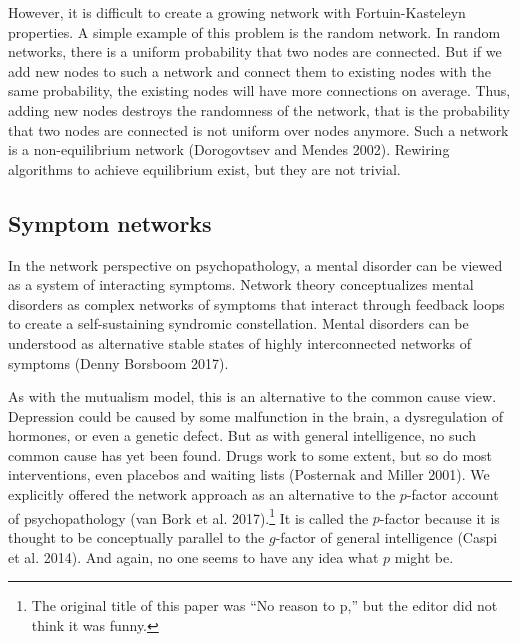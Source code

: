 \documentclass[
  a4paper,
  DIV=11,
  numbers=noendperiod,
  oneside]{scrreprt}
\begin{document}
However, it is difficult to create a growing network with
Fortuin-Kasteleyn properties. A simple example of this problem is the
random network. In random networks, there is a uniform probability that
two nodes are connected. But if we add new nodes to such a network and
connect them to existing nodes with the same probability, the existing
nodes will have more connections on average. Thus, adding new nodes
destroys the randomness of the network, that is the probability that two
nodes are connected is not uniform over nodes anymore. Such a network is
a non-equilibrium network (Dorogovtsev and Mendes 2002). Rewiring
algorithms to achieve equilibrium exist, but they are not trivial.

\hypertarget{sec-Symptom-networks}{%
\subsection{Symptom networks}\label{sec-Symptom-networks}}

In the network perspective on psychopathology, a mental disorder can be
viewed as a system of interacting symptoms. Network theory
conceptualizes mental disorders as complex networks of symptoms that
interact through feedback loops to create a self-sustaining syndromic
constellation. Mental disorders can be understood as alternative stable
states of highly interconnected networks of symptoms (Denny Borsboom
2017).

As with the mutualism model, this is an alternative to the common cause
view. Depression could be caused by some malfunction in the brain, a
dysregulation of hormones, or even a genetic defect. But as with general
intelligence, no such common cause has yet been found. Drugs work to
some extent, but so do most interventions, even placebos and waiting
lists (Posternak and Miller 2001). We explicitly offered the network
approach as an alternative to the \(p\)-factor account of
psychopathology (van Bork et al. 2017).\footnote{The original title of
  this paper was ``No reason to p,'' but the editor did not think it was
  funny.} It is called the \(p\)-factor because it is thought to be
conceptually parallel to the \(g\)-factor of general intelligence (Caspi
et al. 2014). And again, no one seems to have any idea what \(p\) might
be.
\end{document}
